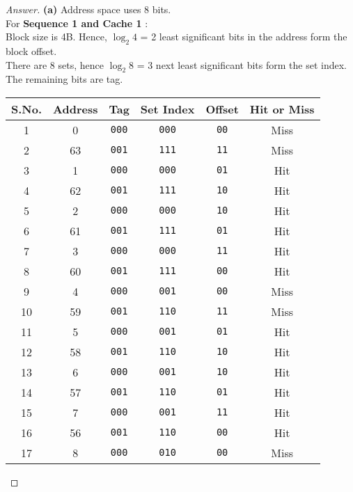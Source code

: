 \documentclass[12pt]{article}
\begin{document}
\begin{proof}[Answer] \textbf{(a)} 	Address space uses 8 bits. \\
	For \textbf{Sequence 1  and Cache 1 }: \\ %
Block size is 4B. Hence, $\log_2 4$ = 2 least significant bits in the address form the block offset. \\
There are 8 sets, hence $\log_2 8$ = 3 next least significant bits form the set index. \\
The remaining bits are tag. 
\begin{center}
\begin{tabular}{||c | c |  c | c | c | c ||}
\hline
\textbf{S.No.} & \textbf{Address} &  \textbf{Tag} &\textbf{Set Index} & \textbf{Offset} & \textbf{Hit or Miss } \\  \hline
1 & 0 & \verb|000| & \verb|000| & \verb|00| & Miss \\ \hline
2 & 63 & \verb|001| & \verb|111| & \verb|11| & Miss \\ \hline
3 & 1 & \verb|000| & \verb|000| & \verb|01| & Hit \\ \hline 
4 & 62 & \verb|001| & \verb|111| & \verb|10| & Hit \\ \hline
5 & 2 & \verb|000| & \verb|000| & \verb|10| & Hit \\ \hline
6 & 61 & \verb|001| & \verb|111| & \verb|01| & Hit \\ \hline
7 & 3 & \verb|000| & \verb|000| & \verb|11| & Hit \\ \hline
8 & 60 & \verb|001| & \verb|111| & \verb|00| & Hit \\ \hline
9 & 4 & \verb|000| & \verb|001| & \verb|00| & Miss \\ \hline
10 & 59 & \verb|001| & \verb|110| & \verb|11| & Miss\\ \hline
11 & 5 & \verb|000| & \verb|001| & \verb|01| & Hit \\ \hline
12 & 58 & \verb|001| & \verb|110| & \verb|10| & Hit \\ \hline
13 & 6 & \verb|000| & \verb|001| & \verb|10| & Hit \\ \hline
14 & 57 & \verb|001| & \verb|110| & \verb|01| & Hit \\ \hline
15 & 7 & \verb|000| & \verb|001| & \verb|11| & Hit \\ \hline
16 & 56 & \verb|001| & \verb|110| & \verb|00| & Hit \\ \hline
17 & 8 & \verb|000| & \verb|010| & \verb|00| & Miss\\ \hline

\end{tabular}
\end{center}
\end{proof}
\end{document}
